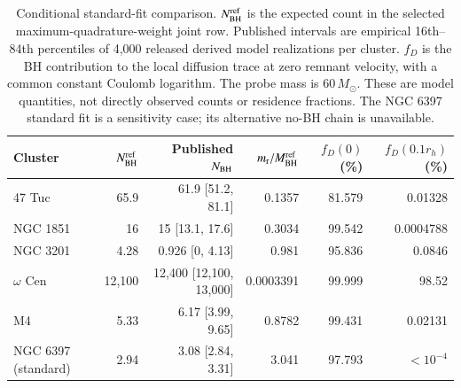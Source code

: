\begin{table}[t]
\caption{Conditional standard-fit comparison. $N_{\rm BH}^{\rm ref}$ is the expected count in the selected maximum-quadrature-weight joint row. Published intervals are empirical 16th--84th percentiles of 4,000 released derived model realizations per cluster. $f_D$ is the BH contribution to the local diffusion trace at zero remnant velocity, with a common constant Coulomb logarithm. The probe mass is $60\,M_\odot$. These are model quantities, not directly observed counts or residence fractions. The NGC 6397 standard fit is a sensitivity case; its alternative no-BH chain is unavailable.}\label{tab:cluster-transport-comparison}
\centering\begin{tabular}{lrrrrr}
\toprule
Cluster & $N_{\rm BH}^{\rm ref}$ & Published $N_{\rm BH}$ & $m_{\rm r}/M_{\rm BH}^{\rm ref}$ & $f_D(0)$ (\%) & $f_D(0.1r_h)$ (\%) \\
\midrule
47 Tuc & 65.9 & 61.9 [51.2, 81.1] & 0.1357 & 81.579 & 0.01328 \\
NGC 1851 & 16 & 15 [13.1, 17.6] & 0.3034 & 99.542 & 0.0004788 \\
NGC 3201 & 4.28 & 0.926 [0, 4.13] & 0.981 & 95.836 & 0.0846 \\
$\omega$ Cen & 12,100 & 12,400 [12,100, 13,000] & 0.0003391 & 99.999 & 98.52 \\
M4 & 5.33 & 6.17 [3.99, 9.65] & 0.8782 & 99.431 & 0.02131 \\
NGC 6397 (standard) & 2.94 & 3.08 [2.84, 3.31] & 3.041 & 97.793 & $<10^{-4}$ \\
\bottomrule
\end{tabular}
\end{table}
